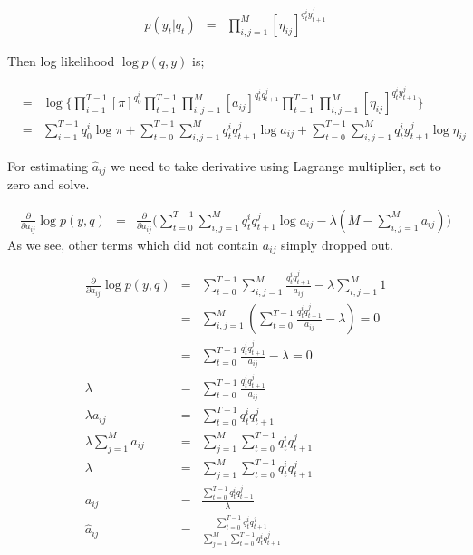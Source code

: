 \begin{eqnarray*}
p(y_t|q_t) &=& \prod_{i,j=1}^M [\eta_{ij}]^{q_t^i y_{t+1}^j}
\end{eqnarray*}

Then log likelihood $\log p(q,y)$ is;

{\small
\begin{eqnarray*}
 &=& \log
 \bigg\{
 \prod_{i=1}^{T-1}[\pi]^{q_0^i}
 \prod_{t=1}^{T-1} \prod_{i,j=1}^M[a_{ij}]^{q_t^i q_{t+1}^j}
 \prod_{t=1}^{T-1} \prod_{i,j=1}^M[\eta_{ij}]^{q_t^i y_{t+1}^j}
 \bigg\} \\
 &=& 
 \sum_{i=1}^{T-1}q_0^i\log \pi +
 \sum_{t=0}^{T-1} \sum_{i,j=1}^M q_t^i q_{t+1}^j \log a_{ij} +
 \sum_{t=0}^{T-1} \sum_{i,j=1}^M q_t^i y_{t+1}^j \log \eta_{ij}
\end{eqnarray*}}

For estimating $\hat{a}_{ij}$ we need to take derivative using Lagrange
multiplier, set to zero and solve.

{\small
\begin{eqnarray*}
\frac{\partial}{\partial a_{ij}} \log p(y,q)
&=&
\frac{\partial}{\partial a_{ij}}
\bigg(
\sum_{t=0}^{T-1} \sum_{i,j=1}^M q_t^i q_{t+1}^j \log a_{ij} -
\lambda (M-\sum_{i,j=1}^M a_{ij})
\bigg)
\end{eqnarray*}
}
As we see, other terms which did not contain $a_{ij}$ simply dropped out.

{\small
\begin{eqnarray*}
\frac{\partial}{\partial a_{ij}} \log p(y,q)
&=& \sum_{t=0}^{T-1} \sum_{i,j=1}^M \frac{q_t^i q_{t+1}^j}{a_{ij}} -
\lambda \sum_{i,j=1}^M 1 \\
&=&  \sum_{i,j=1}^M ( \sum_{t=0}^{T-1} \frac{q_t^i q_{t+1}^j}{a_{ij}} -
\lambda) = 0 \\
&=&  \sum_{t=0}^{T-1} \frac{q_t^i q_{t+1}^j}{a_{ij}} - \lambda = 0 \\
\lambda &=&  \sum_{t=0}^{T-1} \frac{q_t^i q_{t+1}^j}{a_{ij}} \\
\lambda a_{ij} &=&  \sum_{t=0}^{T-1} q_t^i q_{t+1}^j\\
\lambda \sum_{j=1}^M a_{ij} &=&  \sum_{j=1}^M \sum_{t=0}^{T-1} q_t^i q_{t+1}^j\\
\lambda &=&  \sum_{j=1}^M \sum_{t=0}^{T-1} q_t^i q_{t+1}^j\\
a_{ij} &=& \frac{\sum_{t=0}^{T-1} q_t^i q_{t+1}^j}{\lambda} \\
\hat{a}_{ij}  &=& \frac{\sum_{t=0}^{T-1} q_t^i q_{t+1}^j}{\sum_{j=1}^M \sum_{t=0}^{T-1} q_t^i q_{t+1}^j} 
\end{eqnarray*}}

